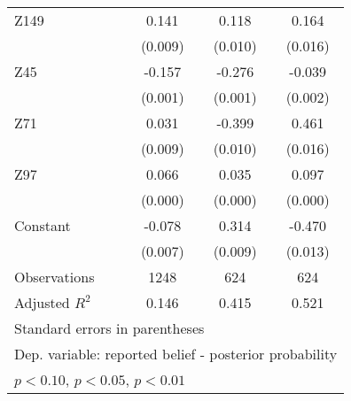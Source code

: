 \begin{table}[htbp]
\begin{tabular}{l*{3}{c}}
Z149            &    0.141\sym{***}&    0.118\sym{***}&    0.164\sym{***}\\
                &  (0.009)         &  (0.010)         &  (0.016)         \\
Z45             &   -0.157\sym{***}&   -0.276\sym{***}&   -0.039\sym{***}\\
                &  (0.001)         &  (0.001)         &  (0.002)         \\
Z71             &    0.031\sym{***}&   -0.399\sym{***}&    0.461\sym{***}\\
                &  (0.009)         &  (0.010)         &  (0.016)         \\
Z97             &    0.066\sym{***}&    0.035\sym{***}&    0.097\sym{***}\\
                &  (0.000)         &  (0.000)         &  (0.000)         \\
Constant        &   -0.078\sym{***}&    0.314\sym{***}&   -0.470\sym{***}\\
                &  (0.007)         &  (0.009)         &  (0.013)         \\
\hline
Observations    &     1248         &      624         &      624         \\
Adjusted \(R^{2}\)&    0.146         &    0.415         &    0.521         \\
\hline\hline
\multicolumn{4}{l}{\footnotesize Standard errors in parentheses}\\
\multicolumn{4}{l}{\footnotesize Dep. variable: reported belief - posterior probability}\\
\multicolumn{4}{l}{\footnotesize \sym{*} \(p<0.10\), \sym{**} \(p<0.05\), \sym{***} \(p<0.01\)}\\
\end{tabular}
\end{table}
